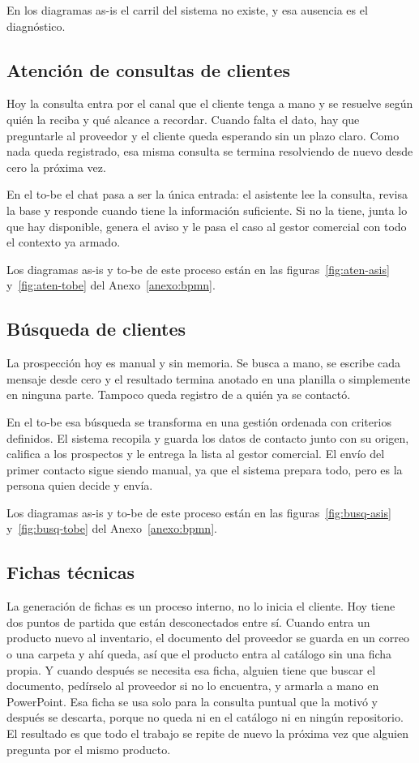 \documentclass{article}
\begin{document}
En los diagramas as-is el carril del sistema no existe, y esa ausencia es el diagnóstico.

\subsection{Atención de consultas de clientes}

Hoy la consulta entra por el canal que el cliente tenga a mano y se resuelve según quién la reciba y qué alcance a recordar. Cuando falta el dato, hay que preguntarle al proveedor y el cliente queda esperando sin un plazo claro. Como nada queda registrado, esa misma consulta se termina resolviendo de nuevo desde cero la próxima vez.

En el to-be el chat pasa a ser la única entrada: el asistente lee la consulta, revisa la base y responde cuando tiene la información suficiente. Si no la tiene, junta lo que hay disponible, genera el aviso y le pasa el caso al gestor comercial con todo el contexto ya armado.

Los diagramas as-is y to-be de este proceso están en las figuras~\ref{fig:aten-asis} y~\ref{fig:aten-tobe} del Anexo~\ref{anexo:bpmn}.

\subsection{Búsqueda de clientes}

La prospección hoy es manual y sin memoria. Se busca a mano, se escribe cada mensaje desde cero y el resultado termina anotado en una planilla o simplemente en ninguna parte. Tampoco queda registro de a quién ya se contactó.

En el to-be esa búsqueda se transforma en una gestión ordenada con criterios definidos. El sistema recopila y guarda los datos de contacto junto con su origen, califica a los prospectos y le entrega la lista al gestor comercial. El envío del primer contacto sigue siendo manual, ya que el sistema prepara todo, pero es la persona quien decide y envía.

Los diagramas as-is y to-be de este proceso están en las figuras~\ref{fig:busq-asis} y~\ref{fig:busq-tobe} del Anexo~\ref{anexo:bpmn}.

\subsection{Fichas técnicas}

La generación de fichas es un proceso interno, no lo inicia el cliente. Hoy tiene dos puntos de partida que están desconectados entre sí. Cuando entra un producto nuevo al inventario, el documento del proveedor se guarda en un correo o una carpeta y ahí queda, así que el producto entra al catálogo sin una ficha propia. Y cuando después se necesita esa ficha, alguien tiene que buscar el documento, pedírselo al proveedor si no lo encuentra, y armarla a mano en PowerPoint. Esa ficha se usa solo para la consulta puntual que la motivó y después se descarta, porque no queda ni en el catálogo ni en ningún repositorio. El resultado es que todo el trabajo se repite de nuevo la próxima vez que alguien pregunta por el mismo producto.
\end{document}
